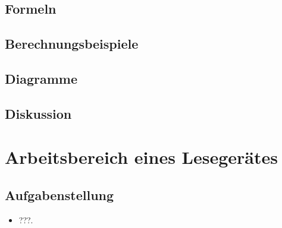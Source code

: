 \documentclass[12pt,a4paper,ngerman]{article}
\begin{document}
\subsection{Formeln}

\subsection{Berechnungsbeispiele}


\pagebreak
\subsection{Diagramme}


\subsection{Diskussion}

\pagebreak



\section{Arbeitsbereich eines Lesegerätes}
\subsection{Aufgabenstellung}

\begin{itemize}
\item ???.
\end{itemize}
\end{document}

